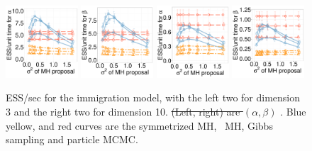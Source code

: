   \begin{figure}[H]
  
  \begin{minipage}[hp]{0.99\linewidth}
  \centering
    \includegraphics [width=0.24\textwidth, angle=0]{figs/new_whole_exp_figs/q_alpha_dim3.pdf}
    \includegraphics [width=0.24\textwidth, angle=0]{figs/new_whole_exp_figs/q_beta_dim3.pdf}
    \includegraphics [width=0.24\textwidth, angle=0]{figs/new_whole_exp_figs/q_alpha_dim10.pdf}
    \includegraphics [width=0.24\textwidth, angle=0]{figs/new_whole_exp_figs/q_beta_dim10.pdf}
  \end{minipage}
    \caption{ESS/sec for the immigration model, with the left two for dimension 3 and the right two for dimension 10. \sout{(Left, 
      right) are $(\alpha, \beta)$} . Blue yellow, and red curves are the symmetrized MH,
  \naive\ MH, Gibbs sampling and particle MCMC.}
     \label{fig:ESS_Q_D33}
\end{figure}

